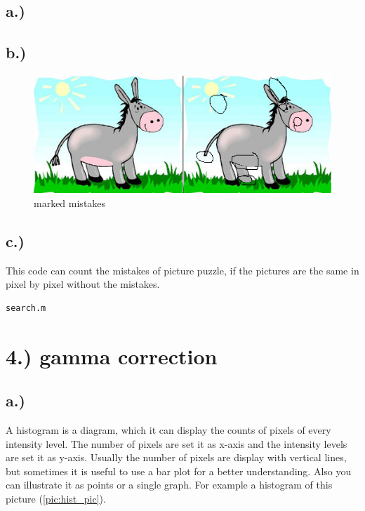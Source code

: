 \documentclass{scrartcl}
\begin{document}
\subsection*{a.)}


\subsection*{b.)}
\begin{figure}[htp!]
\begin{center}
	\includegraphics[scale=1.0]{esel_mistakes.png}
	\caption{marked mistakes}
\end{center}
\end{figure}
\newpage
\subsection*{c.)}
This code can count the mistakes of picture puzzle, if the pictures are the same in pixel by pixel without the mistakes.
\begin{Verbatim}[frame=bottomline]
	search.m
\end{Verbatim}


\section*{4.) gamma correction}
\subsection*{a.)}
A histogram is a diagram, which it can display the counts of pixels of every intensity level. The number of pixels are set it as x-axis and the intensity levels are set it as y-axis. Usually the number of pixels are display with vertical lines, but sometimes it is useful to use a bar plot for a better understanding. Also you can illustrate it as points or a single graph. For example a histogram of this picture (\ref{pic:hist_pic}).   
\end{document}
